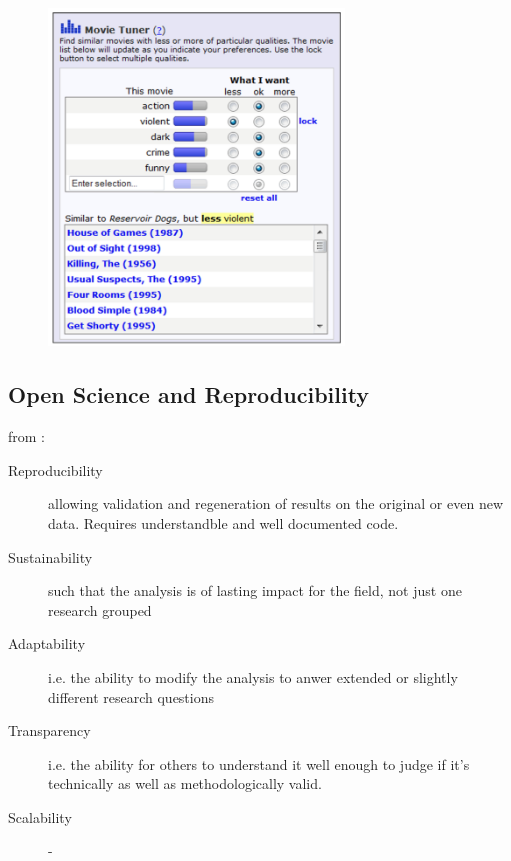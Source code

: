 \begin{figure}[H]
	\centering
	\includegraphics[width=0.7\textwidth]{graphics/stolenfigures/movietuner.png}
\end{figure}

\subsection{Open Science and Reproducibility}

\label{sec:reproducibility}


from \cite{Molder2021a}: 

\begin{description}
	\item[Reproducibility] allowing validation and regeneration of results on the original or even new data. Requires understandble and well documented code.
	\item[Sustainability] such that the analysis is of lasting impact for the field, not just one research grouped
	\item[Adaptability] i.e. the ability to modify the analysis to anwer extended or slightly different research questions
	\item[Transparency] i.e. the ability for others to understand it well enough to judge if it's technically as well as methodologically valid.
	\item[Scalability] - 
\end{description}


